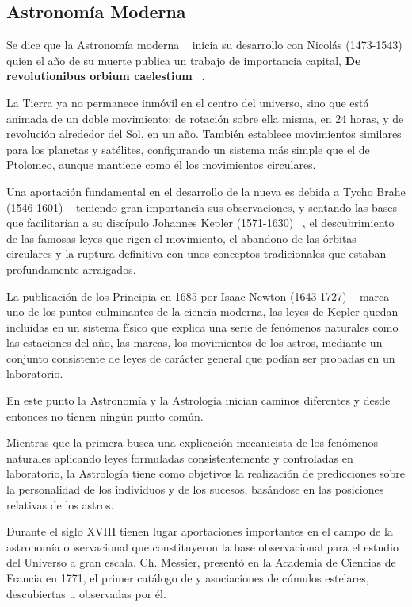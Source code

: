 \newpage

\subsection{Astronomía Moderna}

\bigskip
Se dice que la Astronomía moderna ~\cite{AstMod} inicia su desarrollo con Nicolás  (1473-1543)  quien el año de su muerte publica un trabajo de importancia capital, \textbf{De revolutionibus orbium caelestium} ~\cite{Copernico}.

\bigskip
 La Tierra ya no permanece inmóvil en el centro del universo, sino que está animada de un doble movimiento: de rotación sobre ella misma, en 24 horas, y de revolución alrededor del Sol, en un año. También establece movimientos similares para los planetas y satélites, configurando un sistema más simple que el de Ptolomeo, aunque mantiene como él los movimientos circulares.

\bigskip
Una aportación fundamental en el desarrollo de la nueva es debida a Tycho Brahe (1546-1601) ~\cite{Tycho} teniendo gran importancia sus observaciones, y  sentando las bases que facilitarían a su discípulo Johannes Kepler (1571-1630) ~\cite{Kepler}, el descubrimiento de las famosas leyes que rigen el movimiento, el abandono de las órbitas circulares y la ruptura definitiva con unos conceptos tradicionales que estaban profundamente arraigados. 

\bigskip
La publicación de los Principia en 1685 por Isaac Newton (1643-1727) ~\cite{Newton} marca uno de los puntos culminantes de la ciencia moderna, las leyes de Kepler quedan incluidas en un sistema físico que explica una serie de fenómenos naturales como las estaciones del año, las mareas, los movimientos de los astros, mediante un conjunto consistente de leyes de carácter general que podían ser probadas en un laboratorio.

\bigskip
En este punto la Astronomía y la Astrología inician caminos diferentes y desde entonces no tienen ningún punto común.

\bigskip
Mientras que la primera busca una explicación mecanicista de los fenómenos naturales aplicando leyes formuladas consistentemente y controladas en laboratorio, la Astrología tiene como objetivos la realización de predicciones sobre la personalidad de los individuos y de los sucesos, basándose en las posiciones relativas de los astros.  ~\cite{astrologia}

\bigskip
Durante el siglo XVIII tienen lugar aportaciones importantes en el campo de la astronomía observacional que constituyeron la base observacional para el estudio del Universo a gran escala. Ch. Messier, presentó en la Academia de Ciencias de Francia en 1771, el primer catálogo de y asociaciones de cúmulos estelares, descubiertas u observadas por él. ~\cite{messier}

